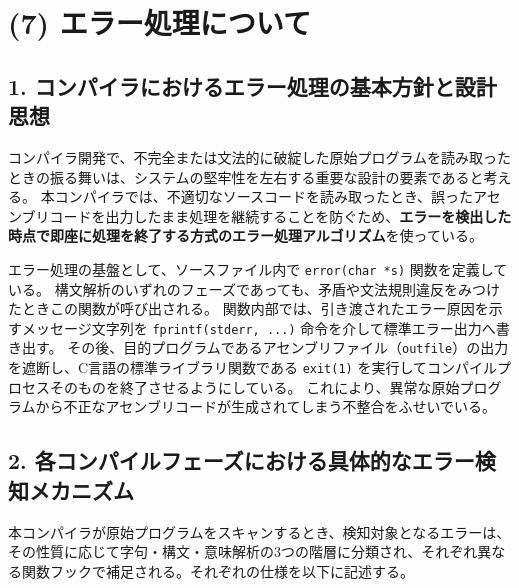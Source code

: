 \documentclass[11pt,a4paper,dvipdfmx]{bxjsarticle}
\begin{document}
\section*{(7) エラー処理について}

\subsection*{1. コンパイラにおけるエラー処理の基本方針と設計思想}
コンパイラ開発で、不完全または文法的に破綻した原始プログラムを読み取ったときの振る舞いは、システムの堅牢性を左右する重要な設計の要素であると考える。
本コンパイラでは、不適切なソースコードを読み取ったとき、誤ったアセンブリコードを出力したまま処理を継続することを防ぐため、\textbf{エラーを検出した時点で即座に処理を終了する方式のエラー処理アルゴリズム}を使っている。

エラー処理の基盤として、ソースファイル内で \texttt{error(char *s)} 関数を定義している。
構文解析のいずれのフェーズであっても、矛盾や文法規則違反をみつけたときこの関数が呼び出される。
関数内部では、引き渡されたエラー原因を示すメッセージ文字列を \texttt{fprintf(stderr, ...)} 命令を介して標準エラー出力へ書き出す。
その後、目的プログラムであるアセンブリファイル（\texttt{outfile}）の出力を遮断し、C言語の標準ライブラリ関数である \texttt{exit(1)} を実行してコンパイルプロセスそのものを終了させるようにしている。
これにより、異常な原始プログラムから不正なアセンブリコードが生成されてしまう不整合をふせいでいる。

\subsection*{2. 各コンパイルフェーズにおける具体的なエラー検知メカニズム}
本コンパイラが原始プログラムをスキャンするとき、検知対象となるエラーは、その性質に応じて字句・構文・意味解析の3つの階層に分類され、それぞれ異なる関数フックで補足される。それぞれの仕様を以下に記述する。
\end{document}
